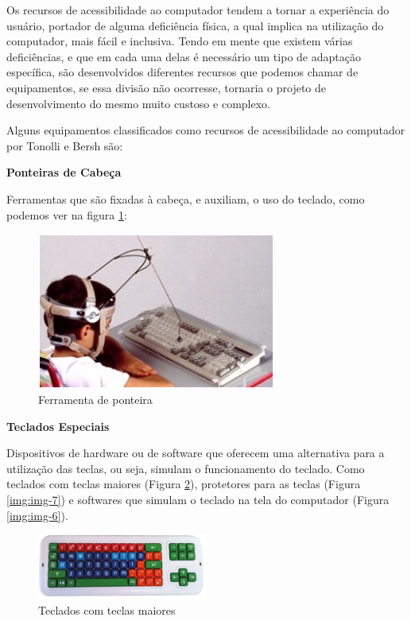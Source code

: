 \documentclass[
	12pt,			%
	openright,		%
	oneside,			%
	a4paper,			%
	chapter=TITLE,		%
	english,			%
	brazil,			%
	]{abntex2}
\begin{document}
Os recursos de acessibilidade ao computador tendem a tornar a experiência do usuário, portador de alguma deficiência física, a qual implica na utilização do computador, mais fácil e inclusiva. Tendo em mente que existem várias deficiências, e que em cada uma delas é necessário um tipo de adaptação específica, são desenvolvidos diferentes recursos que podemos chamar de equipamentos, se essa divisão não ocorresse, tornaria o projeto de desenvolvimento do mesmo muito custoso e complexo.

Alguns equipamentos classificados como recursos de acessibilidade ao computador por Tonolli e Bersh são:

\textbf{Ponteiras de Cabeça}

Ferramentas que são fixadas à cabeça, e auxiliam, o uso do teclado, como podemos ver na figura \ref{img:img-12}:

\begin{figure}[H]
	\centering
		\includegraphics[width=0.7\textwidth]{./img/img-12.jpg}
		\caption{Ferramenta de ponteira}
		\label{img:img-12}
\end{figure}

\textbf{Teclados Especiais}

Dispositivos de hardware ou de software que oferecem uma alternativa para a utilização das teclas, ou seja, simulam o funcionamento do teclado. Como teclados com teclas maiores (Figura \ref{img:img-5}), protetores para as teclas (Figura \ref{img:img-7}) e softwares que simulam o teclado na tela do computador (Figura \ref{img:img-6}).

\begin{figure}[H]
	\centering
		\includegraphics[width=0.5\textwidth]{./img/img-5.png}
		\caption{Teclados com teclas maiores}
		\label{img:img-5}
\end{figure}
\end{document}
